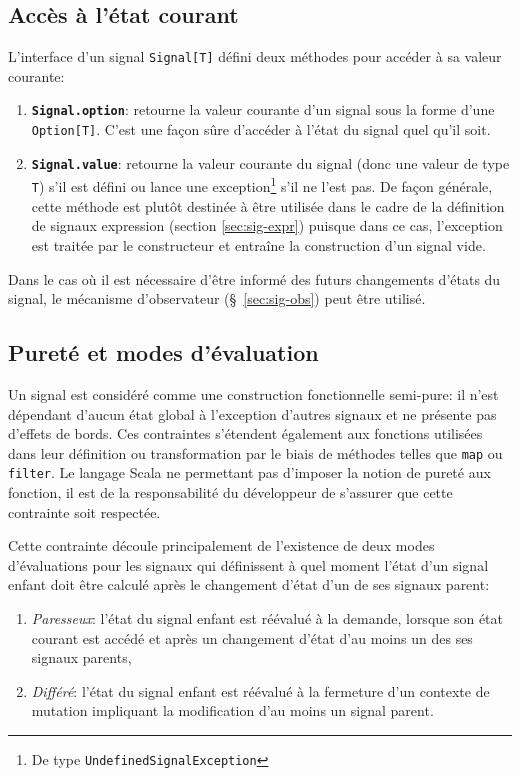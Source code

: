 \subsection{Accès à l'état courant}
L'interface d'un signal \texttt{Signal[T]} défini deux méthodes pour accéder à sa valeur courante:
\begin{enumerate}
	\item \textbf{\texttt{Signal.option}}: retourne la valeur courante d'un signal sous la forme d'une \texttt{Option[T]}. C'est une façon sûre d'accéder à l'état du signal quel qu'il soit.
	
	\item \textbf{\texttt{Signal.value}}: retourne la valeur courante du signal (donc une valeur de type \texttt{T}) s'il est défini ou lance une exception\footnote{De type \texttt{UndefinedSignalException}} s'il ne l'est pas. De façon générale, cette méthode est plutôt destinée à être utilisée dans le cadre de la définition de signaux expression (section \ref{sec:sig-expr}) puisque dans ce cas, l'exception est traitée par le constructeur et entraîne la construction d'un signal vide.
\end{enumerate}

Dans le cas où il est nécessaire d'être informé des futurs changements d'états du signal, le mécanisme d'observateur (§~\ref{sec:sig-obs}) peut être utilisé.

\subsection{Pureté et modes d'évaluation} \label{sec:sig-pureness}
Un signal est considéré comme une construction fonctionnelle semi-pure: il n'est dépendant d'aucun état global à l'exception d'autres signaux et ne présente pas d'effets de bords. Ces contraintes s'étendent également aux fonctions utilisées dans leur définition ou transformation par le biais de méthodes telles que \texttt{map} ou \texttt{filter}. Le langage Scala ne permettant pas d'imposer la notion de pureté aux fonction, il est de la responsabilité du développeur de s'assurer que cette contrainte soit respectée.

Cette contrainte découle principalement de l'existence de deux modes d'évaluations pour les signaux qui définissent à quel moment l'état d'un signal enfant doit être calculé après le changement d'état d'un de ses signaux parent:

\begin{enumerate}
	\item \emph{Paresseux}: l'état du signal enfant est réévalué à la demande, lorsque son état courant est accédé et après un changement d'état d'au moins un des ses signaux parents,
	\item \emph{Différé}: l'état du signal enfant est réévalué à la fermeture d'un contexte de mutation impliquant la modification d'au moins un signal parent.
\end{enumerate}

